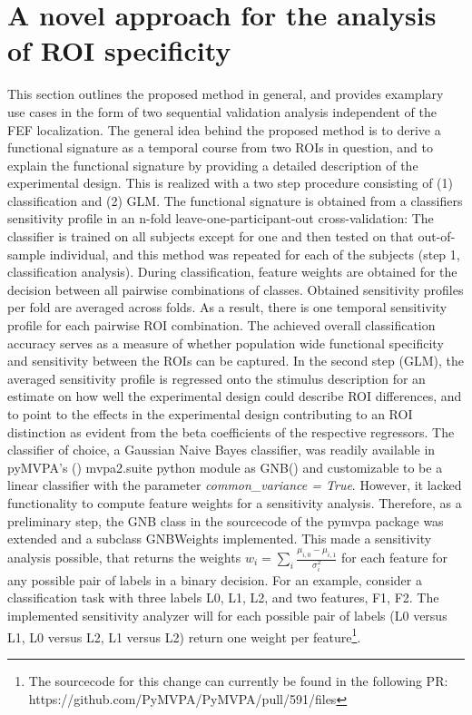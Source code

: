 \documentclass[a4paper, 12pt]{scrreprt}
\begin{document}
\section{A novel approach for the analysis of ROI specificity}\label{newmethod}
This section outlines the proposed method in general, and provides examplary use cases in the form of two sequential validation analysis independent of the FEF localization. \newline
The general idea behind the proposed method is to derive a functional signature as a temporal course from two ROIs in question, and to explain the functional signature by providing a detailed description of the experimental design. This is realized with a two step procedure consisting of (1) classification and (2) GLM.\newline
The functional signature is obtained from a classifiers sensitivity profile in an n-fold leave-one-participant-out cross-validation: The classifier is trained on all subjects except for one and then tested on that out-of-sample individual, and this method was repeated for each of the subjects (step 1, classification analysis). During classification, feature weights are obtained for the decision between all pairwise combinations of classes. Obtained sensitivity profiles per fold are averaged across folds. As a result, there is one temporal sensitivity profile for each pairwise ROI combination. The achieved overall classification accuracy serves as a measure of whether population wide functional specificity and sensitivity between the ROIs can be captured. In the second step (GLM), the averaged sensitivity profile is regressed onto the stimulus description for an estimate on how well the experimental design could describe ROI differences, and to point to the effects in the experimental design contributing to an ROI distinction as evident from the beta coefficients of the respective regressors. \newline
The classifier of choice, a Gaussian Naive Bayes classifier, was readily available in pyMVPA’s (\cite{hanke2009pymvpa}) mvpa2.suite python module as GNB() and customizable to be a linear classifier with the parameter \textit{common\_variance = True}. However, it lacked functionality to compute feature weights for a sensitivity analysis. Therefore, as a preliminary step, the GNB class in the sourcecode of the pymvpa package was extended and a subclass GNBWeights implemented. This made a sensitivity analysis possible, that returns the weights $w_i = \sum_{i}\frac{\mu_{i, 0}-\mu_{i, 1}}{\sigma_{i}^{2}}$ for each feature for any possible pair of labels in a binary decision. For an example, consider a classification task with three labels L0, L1, L2, and two features, F1, F2. The implemented sensitivity analyzer will for each possible pair of labels (L0 versus L1, L0 versus L2, L1 versus L2) return one weight per feature\footnote{The sourcecode for this change can currently be found in the following PR: https://github.com/PyMVPA/PyMVPA/pull/591/files}. \newline
\end{document}
